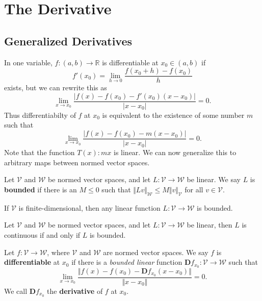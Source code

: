 \documentclass[10pt]{report}
\begin{document}

\chapter{The Derivative}


\section{Generalized Derivatives}

In one variable, $f:(a,b) \to \mathbb{R}$ is differentiable at $x_0 \in (a,b)$ if
\[
	f'(x_0) = \lim_{h \to 0} \frac{f(x_0+h) - f(x_0)}{h} 
\] exists, but we can rewrite this as
\[
	\lim_{x \to x_0} \frac{|f(x)-f(x_0) - f'(x_0)(x-x_0)|}{|x-x_0|} =0.
\] Thus differentiabilty of $f$ at $x_0$ is equivalent to the existence of some number $m$ such that
\[
	\lim_{x \to x_0} \frac{|f(x)-f(x_0) - m(x-x_0)|}{|x-x_0|} =0.
\] Note that the function $T(x) : mx$ is linear.  We can now generalize this to arbitrary maps between normed vector spaces.

\begin{defn}[]
Let $\mathcal{V}$ and $\mathcal{W}$ be normed vector spaces, and let $L:\mathcal{V}\to\mathcal{W}$ be linear. We say $L$ is \textbf{bounded} if there is an $M \leq 0$ such that $\Vert{L v}\Vert_\mathcal{W} \leq M \Vert{v}\Vert_\mathcal{V}$ for all $v \in \mathcal{V}$.
\end{defn}

\begin{prop}
	If $\mathcal{V}$ is finite-dimensional, then any linear function $L:\mathcal{V} \to \mathcal{W}$ is bounded.
\end{prop}

\begin{prop}
	Let $\mathcal{V}$ and $\mathcal{W}$ be normed vector spaces, and let $L:\mathcal{V}\to\mathcal{W}$ be linear, then $L$ is continuous if and only if $L$ is bounded.
\end{prop}

\begin{defn}[]
	Let $f: \mathcal{V} \to \mathcal{W}$, where $\mathcal{V}$ and $\mathcal{W}$ are normed vector spaces. We say $f$ is \textbf{differentiable} at $x_0$ if there is a \textit{bounded linear} function $\mathbf{D}f_{x_0}: \mathcal{V} \to \mathcal{W}$ such that
	\[
		\lim_{x \to x_0} \frac{\Vert{f(x) - f(x_0) - \mathbf{D}f_{x_0}(x-x_0)}\Vert}{\Vert{x-x_0}\Vert} =0.
	\] We call $\mathbf{D}f_{x_0}$ the \textbf{derivative} of $f$ at $x_0$.
\end{defn}
\end{document}

